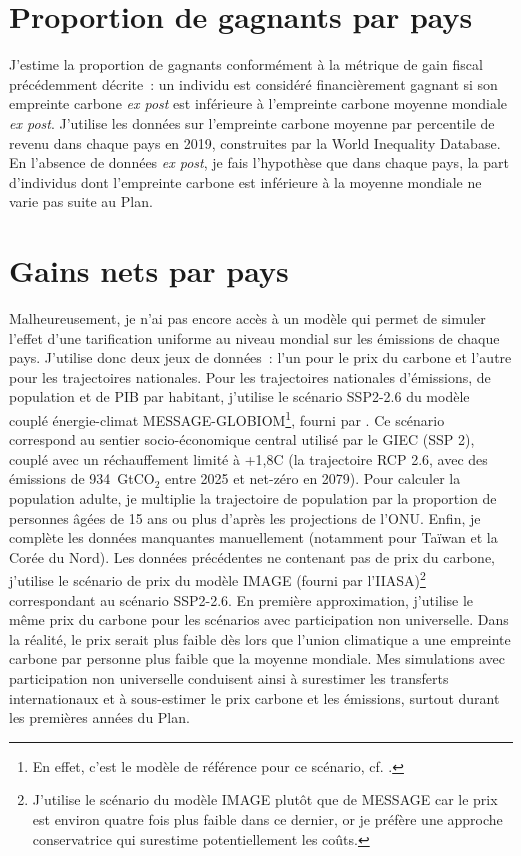 \documentclass[a5paper,french,openany]{memoir}
\begin{document}
\section{Proportion de gagnants par pays}

J'estime la proportion de gagnants conformément à la métrique de gain fiscal précédemment décrite~: un individu est considéré financièrement gagnant si son empreinte carbone \textit{ex post} est inférieure à l'empreinte carbone moyenne mondiale \textit{ex post}. J'utilise les données sur l'empreinte carbone moyenne par percentile de revenu dans chaque pays en 2019, construites par la World Inequality Database. En l'absence de données \textit{ex post}, je fais l'hypothèse que dans chaque pays, la part d'individus dont l'empreinte carbone est inférieure à la moyenne mondiale ne varie pas suite au Plan.

\section{Gains nets par pays}\label{app:pays} 

Malheureusement, je n'ai pas encore accès à un modèle qui permet de simuler l'effet d'une tarification uniforme au niveau mondial sur les émissions de chaque pays. J'utilise donc deux jeux de données~: l'un pour le prix du carbone et l'autre pour les trajectoires nationales. Pour les trajectoires nationales d'émissions, de population et de PIB par habitant, j'utilise le scénario SSP2-2.6 du modèle couplé énergie-climat MESSAGE-GLOBIOM\footnote{En effet, c'est le modèle de référence pour ce scénario, cf. \cite{fricko_marker_2017}.}, fourni par \cite{gutschow_country-resolved_2021}. Ce scénario correspond au sentier socio-économique central utilisé par le GIEC (SSP 2), couplé avec un réchauffement limité à +1,8\textdegree{}C (la trajectoire RCP 2.6, avec des émissions de 934~GtCO$_\text{2}$ entre 2025 et net-zéro en 2079). Pour calculer la population adulte, je multiplie la trajectoire de population par la proportion de personnes âgées de 15 ans ou plus d'après les projections de l'ONU. Enfin, je complète les données manquantes manuellement (notamment pour Taïwan et la Corée du Nord). Les données précédentes ne contenant pas de prix du carbone, j'utilise le scénario de prix du modèle IMAGE (fourni par l'IIASA)\footnote{J'utilise le scénario du modèle IMAGE plutôt que de MESSAGE car le prix est environ quatre fois plus faible dans ce dernier, or je préfère une approche conservatrice qui surestime potentiellement les coûts. 
} correspondant au scénario SSP2-2.6. En première approximation, j'utilise le même prix du carbone pour les scénarios avec participation non universelle. Dans la réalité, le prix serait plus faible dès lors que l'union climatique a une empreinte carbone par personne plus faible que la moyenne mondiale. Mes simulations avec participation non universelle conduisent ainsi à surestimer les transferts internationaux et à sous-estimer le prix carbone et les émissions, surtout durant les premières années du Plan.
\end{document}
